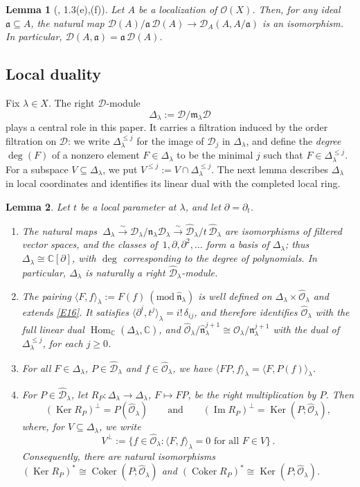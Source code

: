 \documentclass[11pt,reqno]{amsart}
\theoremstyle{plain}
\newtheorem{lemma}{Lemma}[section]
\theoremstyle{definition}
\theoremstyle{remark}
\numberwithin{equation}{section}
\newcommand{\cD}{\mathcal{D}}
\newcommand{\cO}{\mathcal{O}}
\newcommand{\C}{\mathbb{C}}
\newcommand{\del}{\partial}
\newcommand{\fn}{\mathfrak{n}}
\newcommand{\ml}{\mathfrak{m}_\lambda}
\newcommand{\nl}{\mathfrak{n}_\lambda}
\newcommand{\hO}{\widehat{\cO}}
\newcommand{\hD}{\widehat{\cD}}
\newcommand{\hn}{\widehat{\fn}}
\newcommand{\Dl}{\Delta_\lambda}
\newcommand{\lan}{\langle}
\newcommand{\ran}{\rangle}
\DeclareMathOperator{\Hom}{Hom}
\DeclareMathOperator{\Ker}{Ker}
\DeclareMathOperator{\Coker}{Coker}
\DeclareMathOperator{\im}{Im}
\begin{document}
\begin{lemma}[\cite{SmithStafford}, 1.3(e),(f)]
\label{L2.1}
Let $A$ be a localization of $\cO(X)$. Then, for any ideal $\mathfrak{a} \subseteq A$, the natural
map $\cD(A)/\mathfrak{a}\, \cD(A) \to \cD_A(A, A/\mathfrak{a})$ is an isomorphism. In particular,
$\cD(A, \mathfrak{a}) = \mathfrak{a}\,\cD(A)$.
\end{lemma}

\subsection{Local duality}
\label{S2.2}
Fix $\lambda \in X$. The right $\cD$-module
\begin{equation}
\label{E25}
  \Dl := \cD/\ml \cD
\end{equation}
plays a central role in this paper. It carries a filtration induced by the order filtration on
$\cD$: we write $\Dl^{\le j}$ for the image of $\cD_j$ in $\Dl$, and define the \emph{degree}
$\deg(F)$ of a nonzero element $F \in \Dl$ to be the minimal $j$ such that $F \in \Dl^{\le j}$. For
a subspace $V \subseteq \Dl$, we put $V^{\le j} := V \cap \Dl^{\le j}$. The next lemma describes
$\Dl$ in local coordinates and identifies its linear dual with the completed local ring.

\begin{lemma}
\label{L2.2}
Let $t$ be a local parameter at $\lambda$, and let $\del = \del_t$.
\begin{enumerate}
\item[$(a)$] The natural maps $\ \Dl \xrightarrow{\sim} \cD_\lambda/\nl \cD_\lambda \xrightarrow{\sim} \hD_\lambda/ t\,\hD_\lambda$
are isomorphisms of filtered vector spaces, and the classes of $\,1, \del, \del^2, \ldots$ form a
basis of $\Dl$; thus $\Dl \cong \C[\del]$, with $\deg$ corresponding to the degree of polynomials.
In particular, $\Dl$ is naturally a right $\hD_\lambda$-module.
\item[$(b)$] The pairing $\lan F, f \ran_\lambda := F(f)\ (\mathrm{mod}\ \hn_\lambda)$ is well
defined on $\Dl \times \hO_\lambda$ and extends \eqref{E16}. It satisfies
$\lan \del^i, t^j \ran_\lambda = i!\, \delta_{ij}$, and therefore identifies $\hO_\lambda$ with the
full linear dual $\Hom_{\C}(\Dl, \C)$, and $\hO_\lambda/\hn_\lambda^{j+1} \cong
\cO_\lambda/\nl^{j+1}$ with the dual of $\Dl^{\le j}$, for each $j \ge 0$.
\item[$(c)$] For all $F \in \Dl$, $P \in \hD_\lambda$ and $f \in \hO_\lambda$, we have
$\lan F P, f \ran_\lambda = \lan F, P(f) \ran_\lambda$.
\item[$(d)$] For $P \in \hD_\lambda$, let $R_P : \Dl \to \Dl$, $F \mapsto F P$, be the right
multiplication by $P$. Then
\[
  (\Ker R_P)^{\perp} = P(\hO_\lambda) \qquad \text{and} \qquad (\im R_P)^\perp = \Ker(P;
  \hO_\lambda) ,
\]
where, for $V \subseteq \Dl$, we write 
%
$$ 
V^\perp := \{ f \in \hO_\lambda : \lan F, f \ran_\lambda =
0 \text{ for all } F \in V\}\,.
$$
%
Consequently, there are natural isomorphisms
$(\Ker R_P)^* \cong \Coker(P; \hO_\lambda)$ and $(\Coker R_P)^* \cong \Ker(P; \hO_\lambda)$.
\end{enumerate}
\end{lemma}
\end{document}
